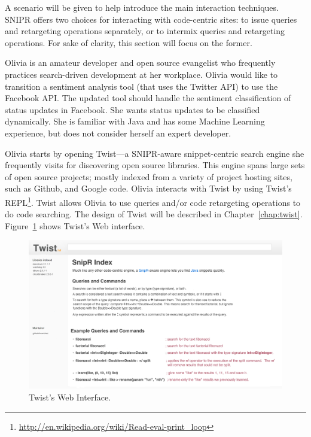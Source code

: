 A scenario will be given to help introduce the main interaction techniques. \uppercase{SnipR} offers two choices for interacting with code-centric sites: to issue queries and retargeting operations separately, or to intermix queries and retargeting operations. For sake of clarity, this section will focus on the former.

Olivia is an amateur developer and open source evangelist who frequently practices search-driven development at her workplace. Olivia would like to transition a sentiment analysis tool (that uses the Twitter API) to use the Facebook API. The updated tool should handle the sentiment classification of status updates in Facebook. She wants status updates to be classified dynamically. She is familiar with Java and has some Machine Learning experience, but does not consider herself an expert developer.

Olivia starts by opening Twist---a \uppercase{SnipR}-aware snippet-centric search engine she frequently visits for discovering open source libraries. This engine spans large sets of open source projects; mostly indexed from a variety of project hosting sites, such as Github, and Google code. Olivia interacts with Twist by using Twist's REPL\footnote{\url{http://en.wikipedia.org/wiki/Read-eval-print_loop}}. Twist allows Olivia to use queries and/or code retargeting operations to do code searching. The design of Twist will be described in Chapter~\ref{chap:twist}. Figure~\ref{fig:twist} shows Twist's Web interface. 

\begin{figure}[!ht]
    \centering
    \includegraphics[width=\textwidth]{images/twistsite}
    \caption{Twist's Web Interface.}
    \label{fig:twist}
\end{figure}

